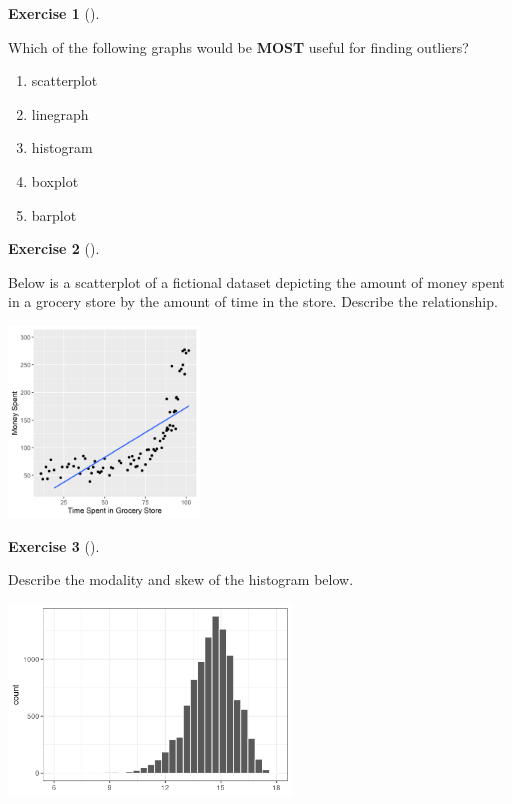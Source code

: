 \documentclass[
  letterpaper,
  DIV=11,
  numbers=noendperiod]{scrreprt}
\providecommand{\tightlist}{%
  \setlength{\itemsep}{0pt}\setlength{\parskip}{0pt}}\usepackage{longtable,booktabs,array}
\theoremstyle{definition}
\newtheorem{exercise}{Exercise}[chapter]
\theoremstyle{remark}
\begin{document}
\leavevmode{}%
\begin{exercise}[]\label{exr-ch02-c09}

Which of the following graphs would be \textbf{MOST} useful for finding
outliers?

\begin{enumerate}
\def\labelenumi{\alph{enumi})}
\tightlist
\item
  scatterplot
\item
  linegraph
\item
  histogram
\item
  boxplot
\item
  barplot
\end{enumerate}

\end{exercise}

\leavevmode{}%
\begin{exercise}[]\label{exr-ch02-c10}

Below is a scatterplot of a fictional dataset depicting the amount of
money spent in a grocery store by the amount of time in the store.
Describe the relationship.

\includegraphics[width=\textwidth,height=2in]{images/exercises/ch02_scatter.png}

\end{exercise}

\leavevmode{}%
\begin{exercise}[]\label{exr-ch02-c11}

Describe the modality and skew of the histogram below.

\includegraphics[width=\textwidth,height=2in]{images/exercises/ch02_match_hist.png}

\end{exercise}
\end{document}

